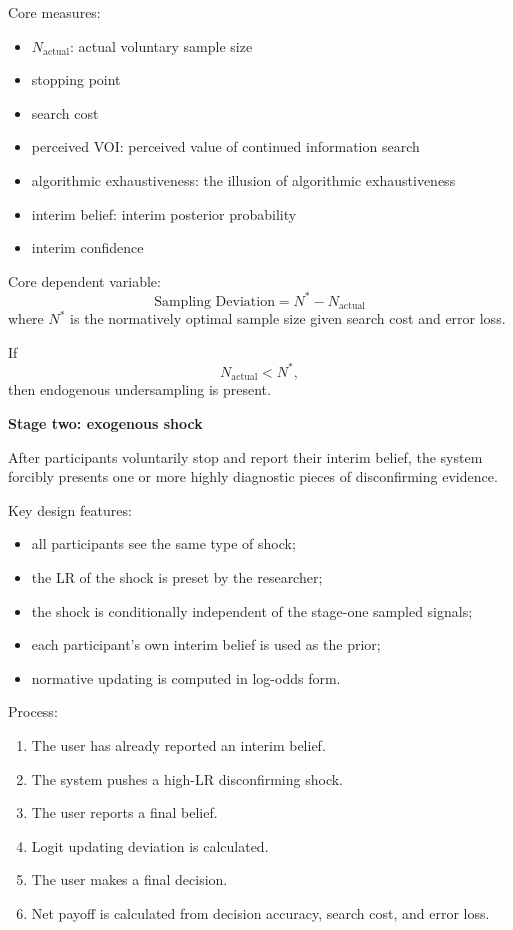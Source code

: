Core measures:
\begin{itemize}[leftmargin=1.5em]
\item \(N_{\text{actual}}\): actual voluntary sample size
\item stopping point
\item search cost
\item perceived VOI: perceived value of continued information search
\item algorithmic exhaustiveness: the illusion of algorithmic exhaustiveness
\item interim belief: interim posterior probability
\item interim confidence
\end{itemize}

Core dependent variable:
\[
\text{Sampling Deviation} = N^{*} - N_{\text{actual}}
\]
where \(N^{*}\) is the normatively optimal sample size given search cost and error loss.

If
\[
N_{\text{actual}} < N^{*},
\]
then endogenous undersampling is present.

\textbf{Stage two: exogenous shock}

After participants voluntarily stop and report their interim belief, the system forcibly presents one or more highly diagnostic pieces of disconfirming evidence.

Key design features:
\begin{itemize}[leftmargin=1.5em]
\item all participants see the same type of shock;
\item the LR of the shock is preset by the researcher;
\item the shock is conditionally independent of the stage-one sampled signals;
\item each participant's own interim belief is used as the prior;
\item normative updating is computed in log-odds form.
\end{itemize}

Process:
\begin{enumerate}[leftmargin=1.8em]
\item The user has already reported an interim belief.
\item The system pushes a high-LR disconfirming shock.
\item The user reports a final belief.
\item Logit updating deviation is calculated.
\item The user makes a final decision.
\item Net payoff is calculated from decision accuracy, search cost, and error loss.
\end{enumerate}

